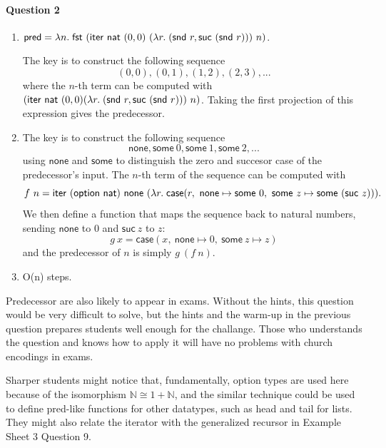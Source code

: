 \documentclass[11pt,a4paper,twoside]{article}
\begin{document}
\paragraph*{Question 2}

\begin{enumerate}[label=(\alph*)]
  \item $\mathsf{pred} = \ulam{n}{\fst\ (\mathsf{iter}\ \mathsf{nat}\ (0,0)\ (\ulam{r}{(\snd\ r, \mathsf{suc}\ (\snd\ r))})\ n)}$.
  
  The key is to construct the following sequence
    \[ (0,0), (0,1), (1,2), (2,3), ...\]
    where the $n$-th term can be computed with 
    $(\mathsf{iter}\ \mathsf{nat}\ (0,0) (\ulam{r}{(\snd\ r, \mathsf{suc}\ (\snd\ r))})\ n)$.
    Taking the first projection of this expression gives the predecessor.
  \item The key is to construct the following sequence
    \[ \mathsf{none}, \mathsf{some}\ 0, \mathsf{some}\ 1, \mathsf{some}\ 2, ...\]
    using $\mathsf{none}$ and $\mathsf{some}$ to distinguish the zero and succesor case
    of the predecessor's input. The $n$-th term of the sequence can be computed with
    \[
      f\ n = \mathsf{iter}\ (\mathsf{option}\ \mathsf{nat})\ \mathsf{none}\ 
      (\ulam{r}{\mathsf{case}(r,\ \mathsf{none} \mapsto \mathsf{some}\ 0,\ 
      \mathsf{some}\ z \mapsto \mathsf{some}\ (\mathsf{suc}\ z))}).\]
    We then define a function that maps the sequence back to natural numbers,
    sending $\mathsf{none}$ to $0$ and $\mathsf{suc}\ z$ to $z$:
    \[ 
      g\ x = \mathsf{case}(x,\ \mathsf{none} \mapsto 0,\ \mathsf{some}\ z \mapsto z)
      \]
    and the predecessor of $n$ is simply $g\ (f\ n)$.
    
  \item O(n) steps.
\end{enumerate}
%
Predecessor are also likely to appear in exams.
Without the hints, this question would be very difficult to solve, but
the hints and the warm-up in the previous question prepares students well enough
for the challange. Those who understands the question and knows how to apply it 
will have no problems with church encodings in exams.

Sharper students might notice that, fundamentally, option types are used here
because of the isomorphism $\mathbb{N} \cong 1 + \mathbb{N}$, and 
the similar technique could be used to define pred-like functions for other datatypes,
such as head and tail for lists. They might also relate the iterator with the generalized
recursor in Example Sheet 3 Question 9.
\end{document}
